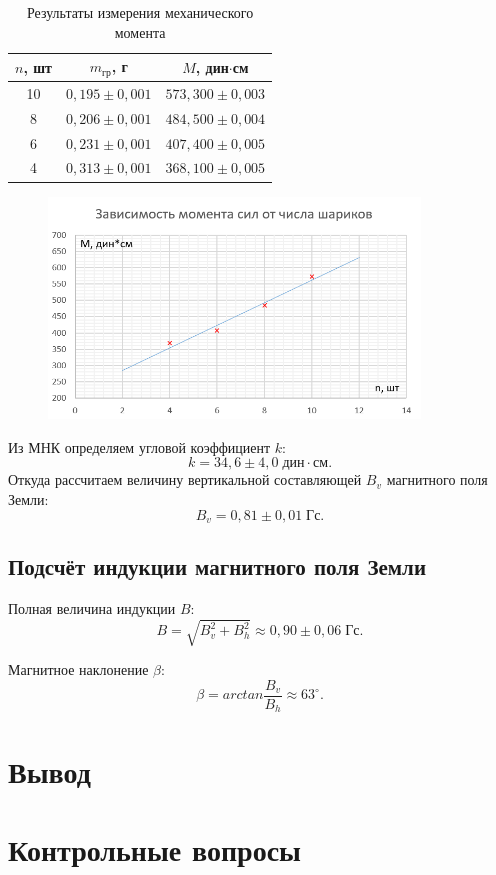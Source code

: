 \documentclass[a4paper]{article}
\theoremstyle{definition}
\theoremstyle{remark}
\begin{document}
\begin{table}[h!]
    \centering
    \begin{tabular}{|c|c|c|}
    \hline
    $n$, шт & $m_{\text{гр}}$, г & $M$, дин$\cdot$см    \\ \hline
    10      & $0,195 \pm 0,001$                  & $573, 300 \pm 0,003$ \\ \hline
    8       & $0,206 \pm 0,001$                  & $484,500 \pm 0,004$  \\ \hline
    6       & $0,231 \pm 0,001$                  & $407,400 \pm 0,005$  \\ \hline
    4       & $0,313 \pm 0,001$                  & $368,100 \pm 0,005$  \\ \hline
    \end{tabular}
    \caption{Результаты измерения механического момента}
    \end{table}

    \begin{figure}[h!]
        \centering
        \includegraphics[width = 280pt]{image/graph2.png}
    \end{figure}

    Из МНК определяем угловой коэффициент $k$: $$k = 34,6 \pm 4,0 \;\text{дин}\cdot\text{см}.$$ Откуда рассчитаем величину вертикальной составляющей $B_v$ магнитного поля Земли: $$B_v = 0,81 \pm 0,01 \;\text{Гс}.$$

\subsection{Подсчёт индукции магнитного поля Земли}

Полная величина индукции $B$:
$$B = \sqrt{B_v^2+B_h^2} \approx 0,90 \pm 0,06\;\text{Гс}.$$

Магнитное наклонение $\beta$: 
$$\beta = arctan{\frac{B_v}{B_h}} \approx 63^\circ.$$

\section{Вывод}

\section{Контрольные вопросы}

 
\end{document}
